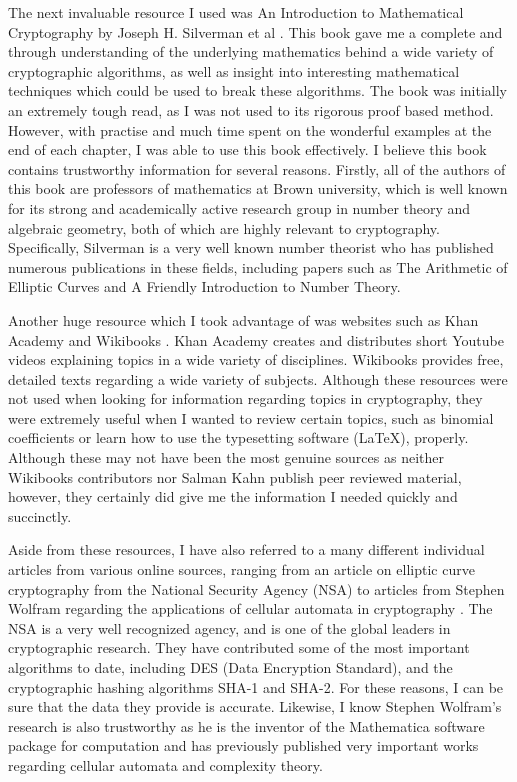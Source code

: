 \documentclass[12pt, a4paper, draft]{report}
\begin{document}
The next invaluable resource I used was An Introduction to Mathematical
Cryptography by Joseph H. Silverman et al \cite{silverman}. This book gave me
a complete and through understanding of the underlying mathematics behind
a wide variety of cryptographic algorithms, as well as insight into
interesting mathematical techniques which could be used to break these
algorithms. The book was initially an extremely tough read, as I was not used
to its rigorous proof based method. However, with practise and much time
spent on the wonderful examples at the end of each chapter, I was able to
use this book effectively. I believe this book contains trustworthy information
for several reasons. Firstly, all of the authors of this book are professors of
mathematics at Brown university, which is well known for its strong and
academically active research group in number theory and algebraic geometry,
both of which are highly relevant to cryptography. Specifically, Silverman is
a very well known number theorist who has published numerous publications in
these fields, including papers such as The Arithmetic of Elliptic Curves and
A Friendly Introduction to Number Theory.

Another huge resource which I took advantage of was websites such as
Khan Academy and Wikibooks \cite{khan, wikibooks}. Khan Academy creates
and distributes short Youtube videos explaining topics in a wide variety of
disciplines. Wikibooks provides free, detailed texts regarding a wide variety
of subjects. Although these resources were not used when looking for
information regarding topics in cryptography, they were extremely useful when
I wanted to review certain topics, such as binomial coefficients or learn how
to use the typesetting software ({\LaTeX}), properly. Although these may
not have been the most genuine sources as neither Wikibooks contributors
nor Salman Kahn publish peer reviewed material, however, they certainly did
give me the information I needed quickly and succinctly. %

Aside from these resources, I have also referred to a many different
individual articles from various online sources, ranging from an article on
elliptic curve cryptography from the National Security Agency (NSA) \cite{nsa}
to articles from Stephen Wolfram regarding the applications of cellular
automata in cryptography \cite{wolfram}. The NSA is a very well recognized
agency, and is one of the global leaders in cryptographic research. They have
contributed some of the most important algorithms to date, including DES
(Data Encryption Standard), and the cryptographic hashing algorithms SHA-1
and SHA-2. For these reasons, I can be sure that the data they provide is
accurate. Likewise, I know Stephen Wolfram's research is also trustworthy as
he is the inventor of the Mathematica software package for computation and has
previously published very important works regarding cellular automata and
complexity theory.
\end{document}
